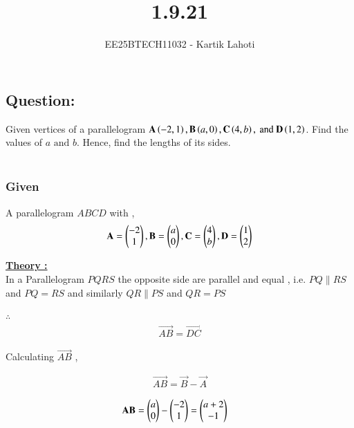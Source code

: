 \documentclass[journal]{IEEEtran}
\numberwithin{equation}{enumi}
\numberwithin{figure}{enumi}
\begin{document}

\vspace{3cm}

\title{1.9.21}
\author{EE25BTECH11032 - Kartik Lahoti}
\maketitle

\subsection*{Question: } 
Given vertices of a parallelogram $\mathbf{A} \left(-2,1\right) , \mathbf{B} \left(a,0\right) , \mathbf{C} \left(4,b\right), \text{ and } \mathbf{D} \left(1,2\right)$. Find the values of $a \text{ and } b $. Hence, find the lengths of its sides. \\
\solution \\ 

\subsubsection*{Given }
A parallelogram $ABCD$ with , 
\begin{align}
    \mathbf{A} = \begin{pmatrix}-2\\1\end{pmatrix} , \mathbf{B} = \begin{pmatrix}a\\0\end{pmatrix} , \mathbf{C} = \begin{pmatrix}4\\b\end{pmatrix} , \mathbf{D} = \begin{pmatrix}1\\2\end{pmatrix}     
\end{align}

\underline{\textbf{Theory :}} \\

In a Parallelogram $PQRS$ the opposite side are parallel and equal , i.e. $PQ \parallel RS $ and $PQ = RS $ and similarly  $QR \parallel  PS $ and $ QR = PS $

$\therefore$  \begin{align}\vec{AB} = \vec{DC}\end{align}

Calculating $\vec{AB}$ , 

\begin{align}
    \vec{AB} = \vec{B} - \vec{A}
\end{align}

\begin{align}
    \mathbf{AB} &= \begin{pmatrix}a\\0\end{pmatrix} - \begin{pmatrix}-2\\1\end{pmatrix} = \begin{pmatrix}a+2\\-1\end{pmatrix}
\end{align}
\end{document}
